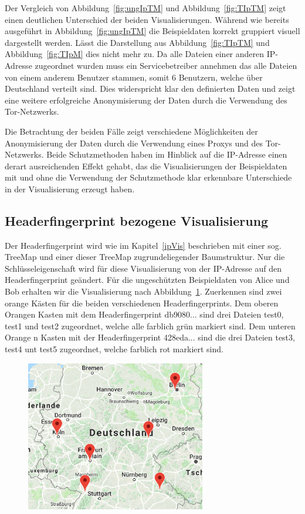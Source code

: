 \documentclass[
    fontsize=12pt,
    headings=small,
    parskip=half,           %
    bibliography=totoc,
    numbers=noenddot,       %
    open=any,               %
    ]{scrreprt}
\begin{document}
Der Vergleich von Abbildung~\ref{fig:ungIpTM} und Abbildung~\ref{fig:TIpTM} zeigt einen deutlichen Unterschied der beiden Visualisierungen.
Während wie bereits ausgeführt in Abbildung~\ref{fig:ungIpTM} die Beispieldaten korrekt gruppiert visuell dargestellt werden. 
Lässt die Darstellung aus Abbildung~\ref{fig:TIpTM} und Abbildung~\ref{fig:TIpM} dies nicht mehr zu.
Da alle Dateien einer anderen IP-Adresse zugeordnet wurden muss ein Servicebetreiber annehmen das alle Dateien von einem anderem Benutzer stammen, somit 6 Benutzern, welche über Deutschland verteilt sind. 
Dies widerspricht klar den definierten Daten und zeigt eine weitere erfolgreiche Anonymisierung der Daten durch die Verwendung des Tor-Netzwerks.

Die Betrachtung der beiden Fälle zeigt verschiedene Möglichkeiten der Anonymisierung der Daten durch die Verwendung eines Proxys und des Tor-Netzwerks.
Beide Schutzmethoden haben im Hinblick auf die IP-Adresse einen derart ausreichenden Effekt gehabt, das die Visualisierungen der Beispieldaten mit und ohne die Verwendung der Schutzmethode klar erkennbare Unterschiede in der Visualisierung erzeugt haben.

    \subsection{Headerfingerprint bezogene Visualisierung}
Der Headerfingerprint wird wie im Kapitel~\ref{ipVis} beschrieben mit einer sog. TreeMap und einer dieser TreeMap zugrundeliegender Baumstruktur.
Nur die Schlüsseleigenschaft wird für diese Visualisierung von der IP-Adresse auf den Headerfingerprint geändert.
Für die ungeschützten Beispieldaten von Alice und Bob erhalten wir die Visualisierung nach Abbildung~\ref{fig:ungHTM}.
Zuerkennen sind zwei orange Kästen für die beiden verschiedenen Headerfingerprints.
Dem oberen Orangen Kasten mit dem Headerfingerprint db9080... sind drei Dateien test0, test1 und test2 zugeordnet, welche alle farblich grün markiert sind.
Dem unteren Orange n Kasten mit der Headerfingerprint 428eda... sind die drei Dateien test3, test4 unt test5 zugeordnet, welche farblich rot markiert sind.

\begin{figure}[H]
\includegraphics[width=0.7\textwidth]{../pic/IP-Tor-SetB.png}
\label{fig:ungHTM}
\end{figure}
\end{document}
